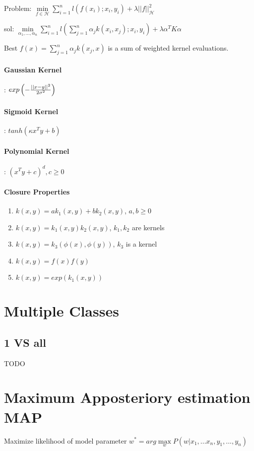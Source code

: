 \documentclass[11pt,twocolumn]{article}
\begin{document}
Problem: $\min \limits_{f \in \mathcal{H}} \sum \limits_{i=1}^n l(f(x_i);x_i, y_i) + \lambda || f||_{\mathcal{H}}^2$

sol: $\min \limits_{\alpha_1,...,\alpha_n} \sum \limits_{i=1}^n l \left( \sum \limits_{j=1}^n \alpha_j k(x_i, x_j);x_i,y_i  \right) + \lambda \alpha^T K \alpha$

Best $f(x) = \sum \limits_{j=1}^n \alpha_j k(x_j, x)$ is a sum of weighted kernel evaluations.

\paragraph{Gaussian Kernel}: $exp\left( - {{||x-y||^2}\over{2 \sigma^2}} \right)$ 


\paragraph{Sigmoid Kernel}: $tanh(\kappa x^T y + b)$

\paragraph{Polynomial Kernel}: $\left( x^Ty + c \right)^d, c \geq 0$

\paragraph{Closure Properties}

\begin{enumerate}
\item $k(x,y) = a k_1(x,y) + b k_2(x,y)$, $a,b \geq 0$
\item $k(x,y) =  k_1(x,y)  k_2(x,y)$, $k_1, k_2$ are kernels
\item $k(x,y) =  k_3(\phi(x),  \phi(y))$, $k_3$ is a kernel
\item $k(x,y) =  f(x) f(y)$
\item $k(x,y) =  exp(k_1(x,y))$
\end{enumerate}

\section{Multiple Classes}

\subsection{1 VS all}
TODO

\section{Maximum Apposteriory estimation MAP}
Maximize likelihood of model parameter $w^* = arg \max \limits_w P(w|x_1,...x_n,y_1,...,y_n) $ 
\end{document}

